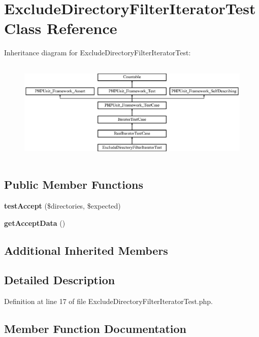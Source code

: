\section{Exclude\+Directory\+Filter\+Iterator\+Test Class Reference}
\label{class_symfony_1_1_component_1_1_finder_1_1_tests_1_1_iterator_1_1_exclude_directory_filter_iterator_test}
Inheritance diagram for Exclude\+Directory\+Filter\+Iterator\+Test\+:\begin{figure}[H]
\begin{center}
\leavevmode
\includegraphics[height=4.955752cm]{class_symfony_1_1_component_1_1_finder_1_1_tests_1_1_iterator_1_1_exclude_directory_filter_iterator_test}
\end{center}
\end{figure}
\subsection*{Public Member Functions}
\begin{DoxyCompactItemize}
\item 
{\bf test\+Accept} (\$directories, \$expected)
\item 
{\bf get\+Accept\+Data} ()
\end{DoxyCompactItemize}
\subsection*{Additional Inherited Members}


\subsection{Detailed Description}


Definition at line 17 of file Exclude\+Directory\+Filter\+Iterator\+Test.\+php.



\subsection{Member Function Documentation}
